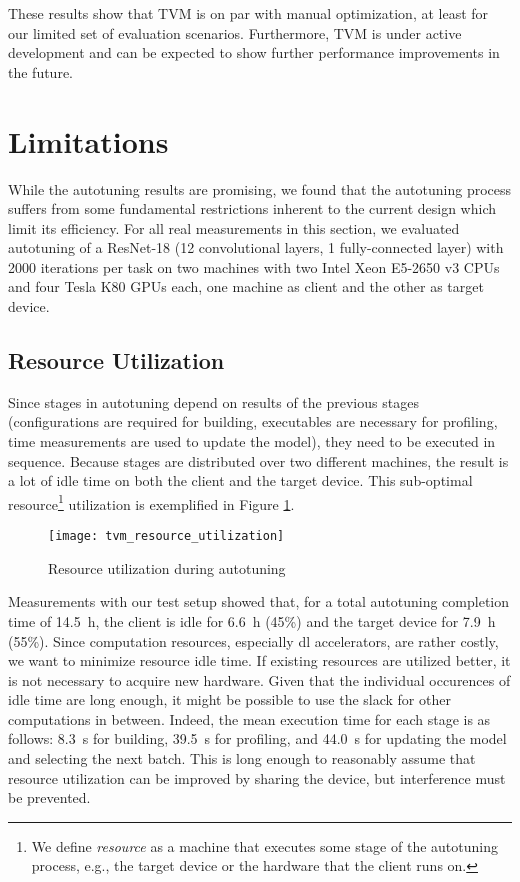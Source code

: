 These results show that TVM is on par with manual optimization, at least for our limited set of evaluation scenarios. Furthermore, TVM is under active development and can be expected to show further performance improvements in the future.

\section{Limitations}
While the autotuning results are promising, we found that the autotuning process suffers from some fundamental restrictions inherent to the current design which limit its efficiency. For all real measurements in this section, we evaluated autotuning of a ResNet-18 (12 convolutional layers, 1 fully-connected layer) with 2000 iterations per task on two machines with two Intel Xeon E5-2650 v3 CPUs and four Tesla K80 GPUs each, one machine as client and the other as target device.

\subsection{Resource Utilization}
Since stages in autotuning depend on results of the previous stages (configurations are required for building, executables are necessary for profiling, time measurements are used to update the model), they need to be executed in sequence. Because stages are distributed over two different machines, the result is a lot of idle time on both the client and the target device. This sub-optimal \gls{resource}\footnote{We define \textit{resource} as a machine that executes some stage of the autotuning process, e.g., the target device or the hardware that the client runs on.} utilization is exemplified in Figure \ref{fig:tvm-res-util}.

\begin{figure}
	\centering
	\texttt{[image: tvm\_resource\_utilization]}%
	\caption{Resource utilization during autotuning}
	\label{fig:tvm-res-util}
\end{figure}

Measurements with our test setup showed that, for a total autotuning completion time of \SI{14.5}{\hour}, the client is idle for \SI{6.6}{\hour} (45\%) and the target device for \SI{7.9}{\hour} (55\%). Since computation resources, especially \gls{dl} accelerators, are rather costly, we want to minimize resource idle time. If existing resources are utilized better, it is not necessary to acquire new hardware. Given that the individual occurences of idle time are long enough, it might be possible to use the slack for other computations in between. Indeed, the mean execution time for each stage is as follows: \SI{8.3}{\second} for building, \SI{39.5}{\second} for profiling, and \SI{44.0}{\second} for updating the model and selecting the next batch. This is long enough to reasonably assume that resource utilization can be improved by sharing the device, but \gls{interference} must be prevented.

